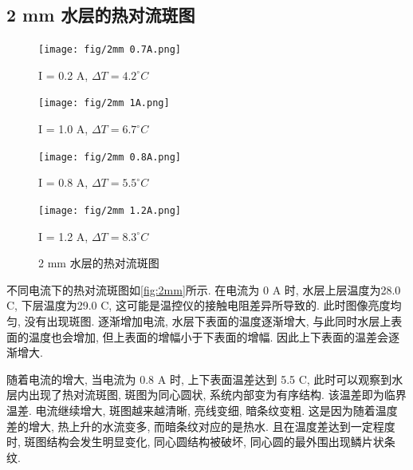 \documentclass[font=default]{mpltx}
\begin{document}
  \subsection{2 mm 水层的热对流斑图}
  \begin{figure}[htbp]      
    \caption{2 mm 水层的热对流斑图}
    \begin{minipage}{0.32\linewidth}
      \vspace{3pt}
      \centerline{\texttt{[image: fig/2mm 0.7A.png]}}
      \centerline{I = 0.2 A, $\Delta T = 4.2^\circ C$}
      \vspace{3pt}
      \centerline{\texttt{[image: fig/2mm 1A.png]}}
      \centerline{I = 1.0 A, $\Delta T = 6.7^\circ C$}
    \end{minipage}
    \begin{minipage}{0.32\linewidth}
      \vspace{3pt}
      \centerline{\texttt{[image: fig/2mm 0.8A.png]}}
      \centerline{I = 0.8 A, $\Delta T = 5.5^\circ C$}
      \vspace{3pt}
      \centerline{\texttt{[image: fig/2mm 1.2A.png]}}
      \centerline{I = 1.2 A, $\Delta T = 8.3^\circ C$}
    \end{minipage}
    \label{fig:2mm}
  \end{figure}
  不同电流下的热对流斑图如\autoref{fig:2mm}所示.
  在电流为 0 A 时, 水层上层温度为28.0 \circ C, 下层温度为29.0 \circ C, 这可能是温控仪的接触电阻差异所导致的. 此时图像亮度均匀, 没有出现斑图.
  逐渐增加电流, 水层下表面的温度逐渐增大, 与此同时水层上表面的温度也会增加, 但上表面的增幅小于下表面的增幅. 因此上下表面的温差会逐渐增大.
  \par
  随着电流的增大, 当电流为 0.8 A 时, 上下表面温差达到 5.5 \circ C, 此时可以观察到水层内出现了热对流斑图, 斑图为同心圆状, 系统内部变为有序结构. 该温差即为临界温差.
  电流继续增大, 斑图越来越清晰, 亮线变细, 暗条纹变粗. 这是因为随着温度差的增大, 热上升的水流变多, 而暗条纹对应的是热水. 
  且在温度差达到一定程度时, 斑图结构会发生明显变化, 同心圆结构被破坏, 同心圆的最外围出现鳞片状条纹. 
\end{document}
